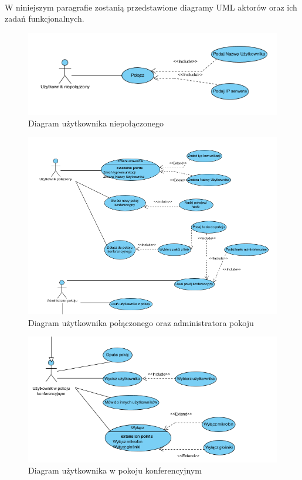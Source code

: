\documentclass[12pt,a4paper,notitlepage]{report}
\begin{document}
	\paragraph{} W niniejszym paragrafie zostanią przedstawione diagramy UML aktorów oraz ich zadań funkcjonalnych.
	\begin{figure}[h]
		\centering
		\includegraphics[scale=0.9]{UserNP}
		\caption[]{Diagram użytkownika niepołączonego}
		\label{fig:DUN}
	\end{figure}
	\begin{figure}[h]
		\centering
		\includegraphics[scale=0.9]{UserPiAdm}
		\caption[]{Diagram użytkownika połączonego oraz administratora pokoju}
		\label{fig:DUP}
	\end{figure}
	\begin{figure}[h]
		\centering
		\includegraphics[scale=0.9]{UserPK}
		\caption[]{Diagram użytkownika w pokoju konferencyjnym}
		\label{fig:DUW}
	\end{figure}
\end{document}
